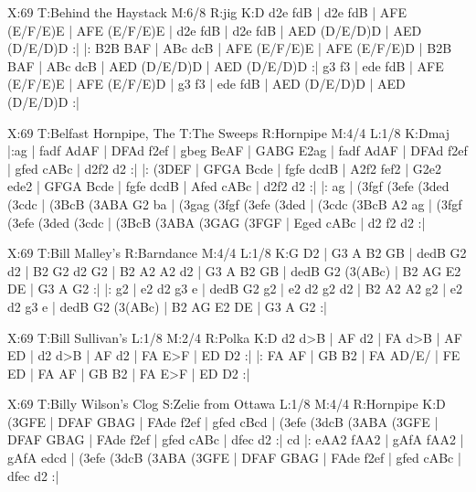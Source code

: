 \documentclass{article}
\begin{document}
\begin{abc}[name]
X:69
T:Behind the Haystack
M:6/8
R:jig
K:D
d2e fdB | d2e fdB | AFE (E/F/E)E | AFE (E/F/E)E |
d2e fdB | d2e fdB | AED (D/E/D)D | AED (D/E/D)D :|
|: B2B BAF | ABc dcB | AFE (E/F/E)E | AFE (E/F/E)D |
B2B BAF | ABc dcB | AED (D/E/D)D | AED (D/E/D)D :|
g3 f3 | ede fdB | AFE (E/F/E)E | AFE (E/F/E)D |
g3 f3 | ede fdB | AED (D/E/D)D | AED (D/E/D)D :|
\end{abc}

\begin{abc}[name]
X:69
T:Belfast Hornpipe, The
T:The Sweeps
R:Hornpipe
M:4/4
L:1/8
K:Dmaj
|:ag | fadf AdAF | DFAd f2ef | gbeg BeAF | GABG E2ag |
fadf AdAF | DFAd f2ef | gfed cABc | d2f2 d2 :|
|: (3DEF | GFGA Bcde | fgfe dcdB | A2f2 fef2 | G2e2 ede2 |
GFGA Bcde | fgfe dcdB | Afed cABc | d2f2 d2 :|
|: ag | (3fgf (3efe (3ded (3cdc | (3BcB (3ABA G2 ba | (3gag (3fgf (3efe (3ded | (3cdc (3BcB A2 ag |
(3fgf (3efe (3ded (3cdc | (3BcB (3ABA (3GAG (3FGF | Eged cABc | d2 f2 d2 :|
\end{abc}

\begin{abc}[name]
X:69
T:Bill Malley's
R:Barndance
M:4/4
L:1/8
K:G
D2 | G3 A B2 GB | dedB G2 d2 | B2 G2 d2 G2 | B2 A2 A2 d2 |
G3 A B2 GB | dedB G2 (3(ABc) | B2 AG E2 DE | G3 A G2 :|
|: g2 | e2 d2 g3 e | dedB G2 g2 | e2 d2 g2 d2 | B2 A2 A2 g2 |
e2 d2 g3 e | dedB G2 (3(ABc) | B2 AG E2 DE | G3 A G2 :|
\end{abc}

\begin{abc}[name]
X:69
T:Bill Sullivan's
L:1/8
M:2/4
R:Polka
K:D
d2 d>B | AF d2 | FA d>B | AF ED |
d2 d>B | AF d2 | FA E>F | ED D2 :|
|: FA AF | GB B2 | FA AD/E/ | FE ED |
FA AF | GB B2 | FA E>F | ED D2 :|
\end{abc}

\begin{abc}[name]
X:69
T:Billy Wilson's Clog
S:Zelie from Ottawa
L:1/8
M:4/4
R:Hornpipe
K:D
(3GFE | DFAF GBAG | FAde f2ef | gfed cBcd | (3efe (3dcB (3ABA (3GFE |
DFAF GBAG | FAde f2ef | gfed cABc | dfec d2 :|
cd |: eAA2 fAA2 | gAfA fAA2 | gAfA edcd | (3efe (3dcB (3ABA (3GFE |
DFAF GBAG | FAde f2ef | gfed cABc | dfec d2 :|
\end{abc}
\end{document}

